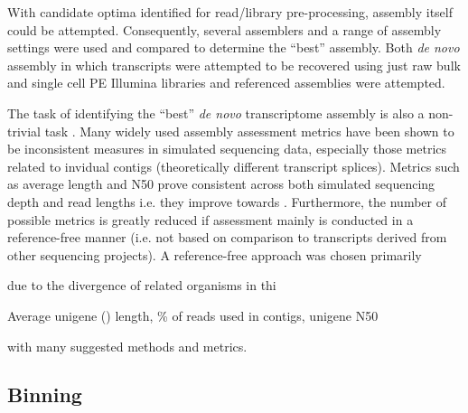 With candidate optima identified for read/library pre-processing, assembly itself could be 
attempted.  Consequently, several assemblers and a range of assembly settings were 
used and compared to determine the ``best'' assembly.   Both \textit{de novo} assembly
in which transcripts were attempted to be recovered using just raw bulk and single cell
PE Illumina libraries and referenced assemblies were attempted.







The task of identifying the ``best'' \textit{de novo} transcriptome assembly is also a non-trivial 
task \citep{Neil2013}.  Many widely used assembly assessment metrics have been shown to be
inconsistent measures in simulated sequencing data, especially those metrics related to invidual
contigs (theoretically different transcript splices).  Metrics such as average length and N50
prove consistent across both simulated sequencing depth and read lengths i.e. they improve 
towards \citep{Neil2013}.  Furthermore, the number of possible metrics is greatly reduced
if assessment mainly is conducted in a reference-free manner (i.e. not based on comparison
to transcripts derived from other sequencing projects).   A reference-free approach was chosen
primarily 










due to the divergence
of related organisms in thi






Average unigene () length, \% of reads used in contigs, unigene N50






with many suggested methods and metrics.





\subsection{Binning}

